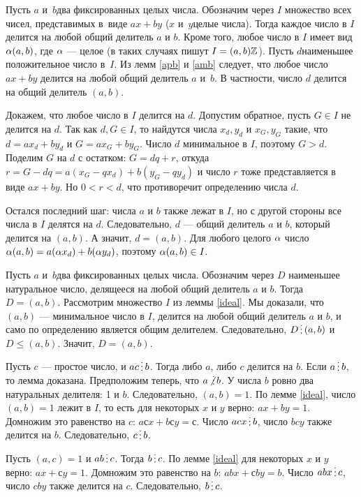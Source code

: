 \documentclass[a4paper,12pt]{article}
\newcommand{\ndv}{\smash{\mskip3mu\not\lower1truept\hbox{\vdots}\mskip3mu}}
\begin{document}
\label{ideal}
Пусть $a$ и~$b$\т два фиксированных целых числа. Обозначим через $I$ множество всех чисел, представимых в~виде $ax+by$ ($x$ и~$y$\т целые числа).
Тогда каждое число в $I$ делится на любой общий делитель $a$ и $b$.
Кроме того, любое число в $I$ имеет вид $\alpha(a,b)$, где $\alpha$ --- целое (в таких случаях пишут $I = (a,b)\mathbb{Z}$).
Пусть $d$\т наименьшее положительное число в~$I$.
Из лемм \ref{apb} и \ref{amb} следует, что любое число $ax+by$ делится на любой общий делитель $a$ и~$b$. В частности, число $d$ делится на общий делитель $(a,b)$.

Докажем, что любое число в $I$ делится на $d$.
Допустим обратное, пусть $G\in I$ не делится на $d$.
Так как $d,G \in I$, то найдутся числа $x_d,y_d$ и $x_G,y_G$ такие, что $d=ax_d+by_d$ и $G=ax_G + by_G$. Число $d$ минимальное в $I$, поэтому $G>d$.
Поделим $G$ на $d$ с остатком: $G=dq+r$, откуда $r=G-dq=a(x_G-qx_d) + b (y_G-qy_d)$ и число $r$ тоже представляется в виде $ax+by$. Но $0<r<d$, что противоречит определению числа $d$.

Остался последний шаг: числа $a$ и $b$ также лежат в $I$, но с другой стороны все числа в $I$ делятся на $d$. Следовательно, $d$ --- общий делитель $a$ и $b$, который делится на $(a,b)$.
А значит, $d=(a,b)$.
Для любого целого $\alpha$ число $\alpha(a,b)=a(\alpha x_d)+b(\alpha y_d)$, поэтому $\alpha(a,b)\in I$.

\label{obsch}
Пусть $a$ и~$b$\т два фиксированных целых числа. Обозначим через $D$ наименьшее натуральное число, делящееся на любой общий делитель $a$ и $b$. Тогда $D=(a,b)$.
Рассмотрим множество $I$ из леммы \ref{ideal}. Мы доказали, что $(a,b)$ --- минимальное число в $I$, делится на любой общий делитель $a$ и $b$, и само по определению является общим делителем. Следовательно, $D\dv (a,b)$ и $D\le (a,b)$. Значит, $D=(a,b)$.


\label{otl}
Пусть $c$ --- простое число, и $ac\dv b$. Тогда либо $a$, либо $c$ делится на $b$.
Если $a\dv b$, то лемма доказана. Предположим теперь, что $a\ndv b$.
У числа $b$ ровно два натуральных делителя: 1 и $b$. Следовательно, $(a,b)=1$.
По лемме \ref{ideal}, число $(a,b)=1$ лежит в $I$, то есть для некоторых $x$ и $y$ верно: $ax+by=1$.
Домножим это равенство на $c$: $aсx+bсy=с$. Число $acx\dv b$, число $bcy$ также делится на $b$. Следовательно, $c\dv b$.

\label{otll}
Пусть $(a,c) = 1$ и $ab\dv c$. Тогда $b\dv c$.
По лемме \ref{ideal} для некоторых $x$ и $y$ верно: $ax+сy=1$.
Домножим это равенство на $b$: $abx+сby=b$. Число $abx\dv c$, число $cby$ также делится на $c$. Следовательно, $b\dv c$.
\end{document}
